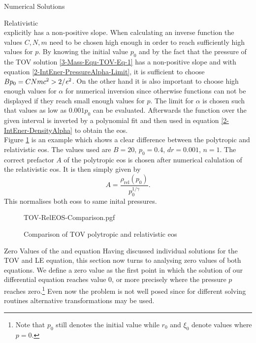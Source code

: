 \begin{section}{Numerical Solutions}
\begin{subsection}{Relativistic }
\begin{equation}
\end{equation}
explicitly has a non-positive slope. 
When calculating an inverse function the values $C,N,m$ need to be chosen high enough in order to reach sufficiently high values for $p$.
By knowing the initial value $p_0$ and by the fact that the pressure of the \ac{TOV} solution \eqref{3-Mass-Equ-TOV-Eq-1} has a non-positive slope and with equation \eqref{2-IntEner-PressureAlpha-Limit}, it is sufficient to choose $Bp_0=CNmc^2>2/\mathit{e}^2$.
On the other hand it is also important to choose high enough values for $\alpha$ for numerical inversion since otherwise functions can not be displayed if they reach small enough values for $p$.
The limit for $\alpha$ is chosen such that values as low as $0.001p_0$ can be evaluated.
Afterwards the function over the given interval is inverted by a polynomial fit and then used in equation \eqref{2-IntEner-DensityAlpha} to obtain the \ac{eos}.\\
Figure \ref{4-NumSol-Plt-RelEOS-TOV-Comparison} is an example which shows a clear difference between the polytropic and relativistic \ac{eos}.
The values used are $B=20$, $p_0=0.4$, $dr=0.001$, $n=1$.
The correct prefactor $A$ of the polytropic \ac{eos} is chosen after numerical calulation of the relativistic \ac{eos}.
It is then simply given by 
\begin{equation}
	A=\frac{\rho_\mathrm{rel}(p_0)}{p_0^{1/\gamma}}.
\end{equation}
This normalises both \acp{eos} to same inital pressures.
\begin{figure}
	\centering
	{TOV-RelEOS-Comparison.pgf}
	\caption[Comparison of TOV polytropic and relativistic EOS]{Comparison of TOV polytropic and relativistic \acs{eos}}
	\label{4-NumSol-Plt-RelEOS-TOV-Comparison}
\end{figure}
\end{subsection}
%
%
\begin{subsection}{Zero Values of the  and  equation}
\label{4-NumSol-Sec-TOV-Exponents}
Having discussed individual solutions for the \ac{TOV} and \ac{LE} equation, this section now turns to analysing zero values of both equations.
We define a zero value as the first point in which the solution of our differential equation reaches value $0$, or more precisely where the pressure $p$ reaches zero.\footnote{Note that $p_0$ still denotes the initial value while $r_0$ and $\xi_0$ denote values where $p=0$.}
Even now the problem is not well posed since for different solving routines alternative transformations may be used.

\end{subsection}
\end{section}
